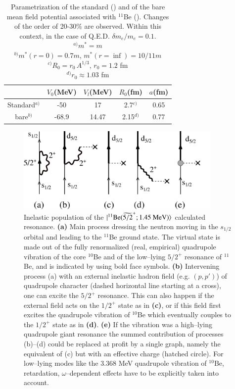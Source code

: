 \begin{table}
\begin{center}
\begin{tabular}{|c|c|c|c|c|}
\hline
  & $V_0$(MeV)  & $V_l$(MeV)  & $R_0$(fm) & $a$(fm)  \\ 
 \hline 
Standard$^{a)}$  & -50  & 17  & 2.7$^{c)}$ & 0.65  \\ 
 \hline 
bare$^{b)}$  & -68.9  & 14.47  & 2.15$^{d)}$ & 0.77  \\ 
 \hline 
\end{tabular}
\end{center}
\caption{Parametrization of the standard (\cite{Bohr:69}) and of the bare mean field potential associated with $^{11}$Be (\cite{Barranco:17}). Changes of the order of 20-30\% are observed. Within this context, in the case of Q.E.D. $\delta m_e/m_e=0.1$.\\$^{a)} m^*=m$\\ $^{b)} m^*(r=0)=0.7m$, $m^*(r=\inf)=10/11m$\\ $^{c)} R_0=r_0\,A^{1/3}$, $r_0=1.2$ fm\\
$^{d)} r_0\approx1.03$ fm\\ }\label{tab6.6.1}
\end{table} 

  \begin{figure}
  \centerline{\includegraphics*[width=10cm,angle=0]{C8/figsC8/fig6_6_1}}
  	\caption{Inelastic population of the $|{^{11}\text{Be}(\widetilde{5/2}^+; 1.45\text{ MeV})} \rangle$  calculated resonance. \textbf{(a)} Main process dressing the neutron moving in the $s_{1/2}$ orbital and leading to the $^{11}$Be ground state. The virtual state is made out of the fully renormalized (real, empirical) quadrupole vibration of the core $^{10}$Be and of the low--lying $5/2^+$ resonance of $^{11}$Be, and is indicated by using bold face symbols. \textbf{(b)} Intervening process (a) with an external inelastic hadron field (e.g. $(p,p')$) of quadrupole character (dashed horizontal line starting at a cross), one can excite the $5/2^+$ resonance. This can also happen if the external field acts on the $1/2^+$ state as in \textbf{(c)}, or if this  field first excites the quadrupole vibration of  $^{10}$Be which eventually couples to the $1/2^+$ state as in \textbf{(d)}. \textbf{(e)} If the vibration was a high--lying quadrupole giant resonance the summed contribution of processes {(b)}--{(d)} could be replaced at profit by a single graph, namely the equivalent of (c) but with an effective charge (hatched circle). For low--lying modes like the 3.368 MeV quadrupole vibration of $^{10}$Be, retardation, $\omega$--dependent effects have to be explicitly taken into account.}\label{fig6.6.1}
  \end{figure}

